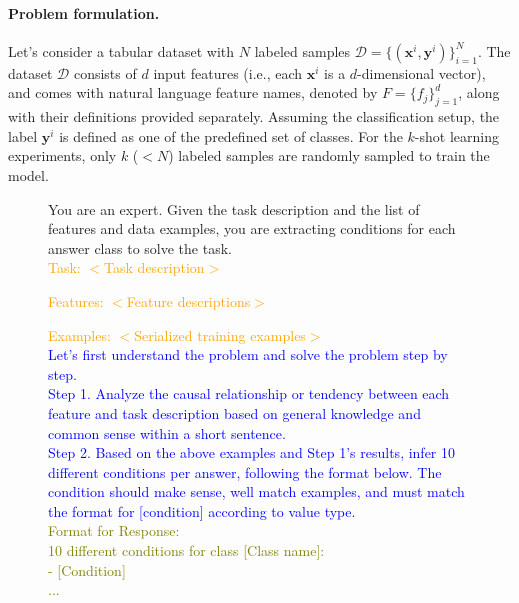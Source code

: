 \documentclass{article}
\theoremstyle{plain}
\theoremstyle{definition}
\theoremstyle{remark}
\newcommand{\cutparagraphup}{\vspace*{-0.12in}}
\begin{document}
\cutparagraphup
\paragraph{Problem formulation.} Let's consider a tabular dataset with $N$ labeled samples $\mathcal{D} = \{(\mathbf{x}^i, \mathbf{y}^i)\}_{i=1}^{N}$. The dataset $\mathcal{D}$ consists of $d$ input features (i.e., each $\mathbf{x}^i$ is a $d$-dimensional vector), and comes with natural language feature names, denoted by $F = \{f_j\}_{j=1}^{d}$, along with their definitions provided separately. Assuming the classification setup, the label $\mathbf{y}^i$ is defined as one of the predefined set of classes. For the $k$-shot learning experiments, only $k$ ($<N$) labeled samples are randomly sampled to train the model. 


\begin{figure}[ht]
\begin{tcolorbox}[enhanced,attach boxed title to top center={yshift=-3mm,yshifttext=-1mm},
  colback=black!0!white, colframe=black!20!white, colbacktitle=black!10!white, coltitle=blue!20!black ]
\footnotesize{
You are an expert. Given the task description and the list of features and data examples, you are extracting conditions for each answer class to solve the task. \\

\textcolor{orange}{Task: $<$Task description$>$}

\textcolor{orange}{Features: $<$Feature descriptions$>$}

\textcolor{orange}{Examples: $<$Serialized training examples$>$} \\

\textcolor{blue}{Let's first understand the problem and solve the problem step by step.} \\

\textcolor{blue}{Step 1. Analyze the causal relationship or tendency between each feature and task description based on general knowledge and common sense within a short sentence.} \\

\textcolor{blue}{Step 2. Based on the above examples and Step 1's results, infer 10 different conditions per answer, following the format below. The condition should make sense, well match examples, and must match the format for [condition] according to value type.}\\

\textcolor{olive}{Format for Response: \\
10 different conditions for class [Class name]: \\
- [Condition]   \\
...\\}


}
\end{tcolorbox}
\end{figure}
\end{document}
